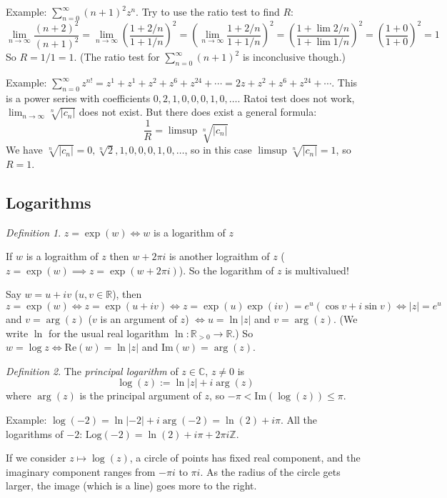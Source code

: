 \documentclass{article}
\theoremstyle{plain}
\theoremstyle{remark}
\newtheorem{definition}{Definition}
\newcommand{\Z}{{\mathbb Z}}
\newcommand{\R}{{\mathbb R}}
\newcommand{\C}{{\mathbb C}}
\begin{document}
Example: $\sum_{n=0}^\infty (n+1)^2 z^n$.
Try to use the ratio test to find $R$:
\[
	\lim_{n\to \infty} \frac{(n+2)^2}{(n+1)^2}
	= \lim_{n\to\infty} \left(\frac{1+2/n}{1+1/n}\right)^2
	= \left(\lim_{n\to\infty} \frac{1+2/n}{1+1/n}\right)^2
	= \left(\frac{1 + \lim 2/n}{1 + \lim 1/n}\right)^2
	= \left(\frac{1 + 0}{1 + 0}\right)^2 = 1
\]
So $R = 1/1 = 1$.
(The ratio test for $\sum_{n=0}^\infty (n+1)^2$ is inconclusive though.)

Example: $\sum_{n=0}^\infty z^{n!} = z^1 + z^1 + z^2 + z^6 + z^{24} + \cdots
= 2z + z^2 + z^6 + z^{24} + \cdots$.
This is a power series with coefficients
$0,2,1,0,0,0,1,0,\dots$.
Ratoi test does not work, $\lim_{n\to\infty} \sqrt[n]{|c_n|}$ does not exist.
But there does exist a general formula:
\[
	\frac{1}{R} = \limsup \sqrt[n]{|c_n|}
\]
We have $\sqrt[n]{|c_n|} = 0, \sqrt[n]{2}, 1, 0, 0, 0, 1, 0, \dots$,
so in this case $\limsup \sqrt[n]{|c_n|} = 1$,
so $R = 1$.

\subsection{Logarithms}
\begin{definition}
	$z = \exp(w) \iff w$ is a logarithm of $z$
\end{definition}
If $w$ is a lograithm of $z$ then $w + 2\pi i$ is another lograithm of $z$
($z = \exp(w) \implies z = \exp(w + 2\pi i)$).
So the logarithm of $z$ is multivalued!

Say $w = u + iv$ ($u,v \in \R$),
then $z = \exp(w) \iff z = \exp(u + iv)
\iff z = \exp(u)\exp(iv) = e^u(\cos{v} + i\sin{v})
\iff |z| = e^u$ and $v = \arg(z)$ ($v$ is an argument of $z$)
$\iff u = \ln |z|$ and $v = \arg(z)$.
(We write $\ln$ for the usual real logarithm $\ln \colon \R_{>0} \to \R$.)
So $w = \log{z} \iff \mathrm{Re}(w) = \ln|z|$ and $\mathrm{Im}(w) = \arg(z)$.

\begin{definition}
	The \emph{principal logarithm} of $z \in \C$, $z \neq 0$ is
	\[
		\log(z) := \ln|z| + i \arg(z)
	\]
	where $\arg(z)$ is the principal argument of $z$,
	so $- \pi < \mathrm{Im}(\log(z)) \leq \pi$.
\end{definition}
Example: $\log(-2) = \ln|-2| + i\arg(-2) = \ln(2) + i\pi$.
All the logarithms of $-2$: $\mathrm{Log}(-2) = \ln(2) + i\pi + 2\pi i \Z$.

If we consider $z \mapsto \log(z)$,
a circle of points has fixed real component,
and the imaginary component ranges from $-\pi i$ to $\pi i$.
As the radius of the circle gets larger, the image (which is a line)
goes more to the right.
\end{document}
